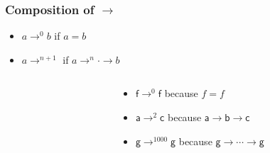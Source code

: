 \documentclass[12pt,aspectratio=169]{beamer}
\newcommand{\m}[1]{\mathsf{#1}}
\begin{document}
\begin{frame}
    \frametitle{Composition of $\rightarrow$}
    \begin{definition}\pause
        \begin{itemize}
            \pause
            \item \alert{$a \rightarrow^{0} b$} if $a = b$
            \pause
            \item \alert{$a \rightarrow^{n+1}$} if $a \rightarrow^{n} \cdot \rightarrow b$
        \end{itemize}
    \end{definition}
    \pause
    \begin{example}
        \begin{columns}
        \begin{column}{0.35\textwidth}
            \centering
            \fig
        \end{column}
        \begin{column}{0.5\textwidth}
            \pause
            \begin{itemize}
                \item $\m{f} \rightarrow^{0} \m{f}$ \pause because $f=f$
                \item $\m{a} \rightarrow^{2} \m{c}$ \pause because $\m{a} \rightarrow \m{b} \rightarrow \m{c}$
                \item $\m{g} \rightarrow^{1000} \m{g}$ \pause  because $\m{g}\rightarrow \cdots \rightarrow \m{g}$
            \end{itemize}
        \end{column}
        \end{columns}
    \end{example}
\end{frame}
\end{document}
